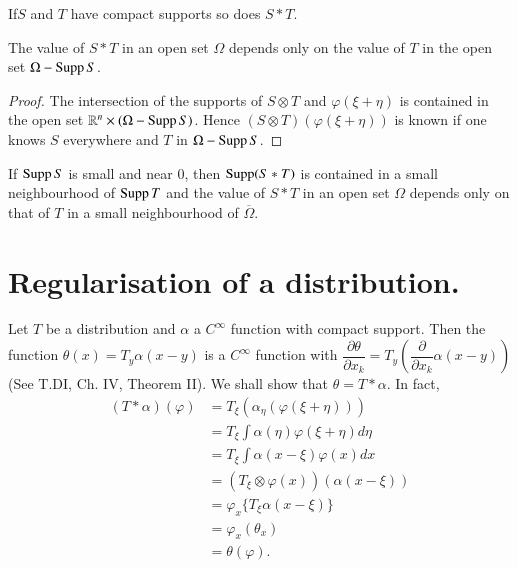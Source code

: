 \begin{coro*}
If\pageoriginale $S$ and $T$ have compact supports so does $S\ast T$.
\end{coro*}

\begin{proposition}\label{chap3-prop6}
The value of $S\ast T$ in an open set $\Omega$ depends only on the
value of $T$ in the open set $\Omega-\operatorname{Supp} S$.
\end{proposition}

\begin{proof}
The intersection of the supports of $S\otimes T$ and
$\varphi(\xi+\eta)$ is contained in the open set $\mathbb{R}^{n}\times
(\Omega-\operatorname{Supp} S)$. Hence $(S\otimes T)(\varphi(\xi+\eta))$ is known if
one knows $S$ everywhere and $T$ in $\Omega-\operatorname{Supp} S$.
\end{proof}

\begin{remark*}
If $\operatorname{Supp} S$ is small and near $0$, then $\operatorname{Supp}(S\ast T)$ is contained
in a small neighbourhood of $\operatorname{Supp} T$ and the value of $S\ast T$ in an
open set $\Omega$ depends only on that of $T$ in a small neighbourhood
of $\overline{\Omega}$.
\end{remark*}

\section*{Regularisation of a distribution.}

Let $T$ be a distribution and $\alpha$ a $C^{\infty}$ function with
compact support. Then the function $\theta(x)=T_{y}\alpha(x-y)$ is a
$C^{\infty}$ function with $\dfrac{\partial \theta}{\partial
  x_{k}}=T_{y}\left(\dfrac{\partial}{\partial x_{k}}\alpha
(x-y)\right)$ (See T.DI, Ch. IV, Theorem II). We shall show that
$\theta=T\ast\alpha$. In fact,
\begin{align*}
(T\ast \alpha) (\varphi) &=
  T_{\xi}(\alpha_{\eta}(\varphi(\xi+\eta)))\\[3pt]
&= T_{\xi}\int \alpha(\eta)\varphi(\xi+\eta)d\eta\\[3pt]
&= T_{\xi}\int \alpha(x-\xi)\varphi(x)dx\\[3pt]
&= (T_{\xi}\otimes \varphi(x))(\alpha(x-\xi))\\[3pt]
&= \varphi_{x}\{T_{\xi}\alpha(x-\xi)\}\\[3pt]
&= \varphi_{x}(\theta_{x})\\[3pt]
&= \theta(\varphi).
\end{align*}

